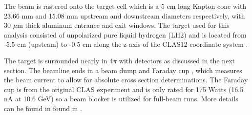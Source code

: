              

            The beam is rastered onto the target cell  which is a 5 cm long Kapton cone with 23.66 mm and 15.08 mm upstream and downstream diameters respectively, with 30 $\mu$m thick aluminum entrance and exit windows. The target used for this analysis consisted of unpolarized pure liquid hydrogen (LH2) and is located from -5.5 cm (upsteam) to -0.5 cm along the z-axis of the CLAS12 coordinate system \parencite{Baltzell2020ThePerformance}. 
            

            The target is surrounded nearly in 4$\pi$ with detectors as discussed in the next section. The beamline ends in a beam dump and Faraday cup , which measures the beam current to allow for absolute cross section determinations. The Faraday cup is from the original CLAS experiment and is only rated for 175 Watts (16.5 nA at 10.6 GeV) so a beam blocker is utilized for full-beam runs. More details can be found in found in \parencite{Mecking2003TheCLAS}. %
            
  
    
